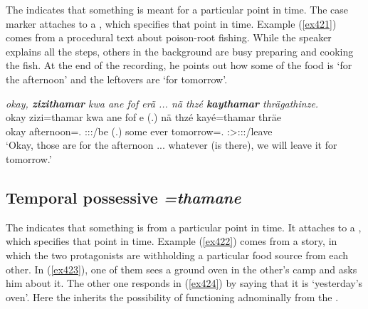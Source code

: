 The    indicates that something is meant for a particular point in time. The case marker attaches to a  , which specifies that point in time. Example (\ref{ex421}) comes from a procedural text about poison-root fishing. While the speaker explains all the steps, others in the background are busy preparing and cooking the fish. At the end of the recording, he points out how some of the food is `for the afternoon' and the leftovers are `for tomorrow'.

\begin{exe}
	\ex \emph{okay, \textbf{zizithamar} kwa ane fof erä ... nä thzé \textbf{kaythamar} thrägathinze.}\\
	\gll okay zizi=thamar kwa ane fof e (.) nä thzé kayé=thamar thräe\\
	okay afternoon=\Temp.\Purp{} \Fut{} \Dem{} \Emph{} \Stpl:\Sbj:\Nonpast:\Ipfv/be (.) some ever tomorrow=\Temp.\Purp{} \Fpl:\Sbj>\Stpl:\Obj:\Irr:\Pfv/leave\\
	\trans `Okay, those are for the afternoon ... whatever (is there), we will leave it for tomorrow.'
	\label{ex421}
\end{exe}

\subsection{Temporal possessive \emph{=thamane}} \label{temporalpossessivecase}

The    indicates that something is from a particular point in time. It attaches to a  , which specifies that point in time. Example (\ref{ex422}) comes from a story, in which the two protagonists are withholding a particular food source from each other. In (\ref{ex423}), one of them sees a ground oven in the other's camp and asks him about it. The other one responds in (\ref{ex424}) by saying that it is `yesterday's oven'. Here the   inherits the possibility of functioning adnominally from the  .  

